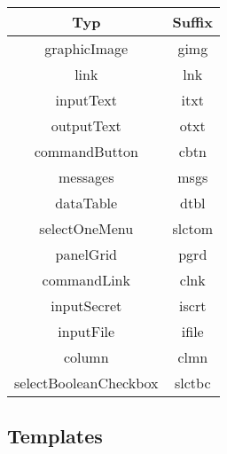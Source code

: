 \begin{table}[H]
	\centering
	\begin{tabular}{|c|c|}
		\hline
		\textbf{Typ} & \textbf{Suffix} \\
		\hline \hline
		graphicImage & gimg \\ \hline
		link & lnk \\ \hline
		inputText & itxt \\ \hline
		outputText & otxt \\ \hline
		commandButton & cbtn \\ \hline
		messages & msgs \\ \hline
		dataTable & dtbl \\ \hline
		selectOneMenu & slctom \\ \hline
		panelGrid & pgrd \\ \hline
		commandLink & clnk \\ \hline
		inputSecret & iscrt \\ \hline
		inputFile & ifile \\ \hline
		column & clmn \\ \hline
		selectBooleanCheckbox & slctbc \\ \hline
	\end{tabular}
\end{table}

\subsection{Templates} $~$



